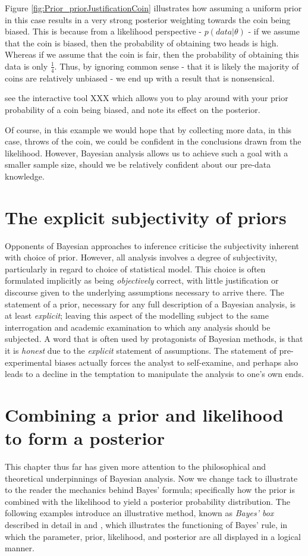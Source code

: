 \documentclass[11pt,fullpage]{book}
\begin{document}
Figure \ref{fig:Prior_priorJustificationCoin} illustrates how assuming a uniform prior in this case results in a very strong posterior weighting towards the coin being biased. This is because from a likelihood perspective - $p(data|\theta)$ - if we assume that the coin is biased, then the probability of obtaining two heads is high. Whereas if we assume that the coin is fair, then the probability of obtaining this data is only $\frac{1}{4}$. Thus, by ignoring common sense - that it is likely the majority of coins are relatively unbiased - we end up with a result that is nonsensical. 

 see the interactive tool XXX which allows you to play around with your prior probability of a coin being biased, and note its effect on the posterior.

Of course, in this example we would hope that by collecting more data, in this case, throws of the coin, we could be confident in the conclusions drawn from the likelihood. However, Bayesian analysis allows us to achieve such a goal with a smaller sample size, should we be relatively confident about our pre-data knowledge.

\section{The explicit subjectivity of priors}
Opponents of Bayesian approaches to inference criticise the subjectivity inherent with choice of prior. However, all analysis involves a degree of subjectivity, particularly in regard to choice of statistical model. This choice is often formulated implicitly as being \textit{objectively} correct, with little justification or discourse given to the underlying assumptions necessary to arrive there. The statement of a prior, necessary for any full description of a Bayesian analysis, is at least \textit{explicit}; leaving this aspect of the modelling subject to the same interrogation and academic examination to which any analysis should be subjected. A word that is often used by protagonists of Bayesian methods, is that it is \textit{honest} due to the \textit{explicit} statement of assumptions. The statement of pre-experimental biases actually forces the analyst to self-examine, and perhaps also leads to a decline in the temptation to manipulate the analysis to one's own ends.

\section{Combining a prior and likelihood to form a posterior} 
This chapter thus far has given more attention to the philosophical and theoretical underpinnings of Bayesian analysis. Now we change tack to illustrate to the reader the mechanics behind Bayes' formula; specifically how the prior is combined with the likelihood to yield a posterior probability distribution. The following examples introduce an illustrative method, known as \textit{Bayes' box} described in detail in \cite{stewart2014teaching} and \cite{bolstad2007introduction}, which illustrates the functioning of Bayes' rule, in which the parameter, prior, likelihood, and posterior are all displayed in a logical manner.
\end{document}
